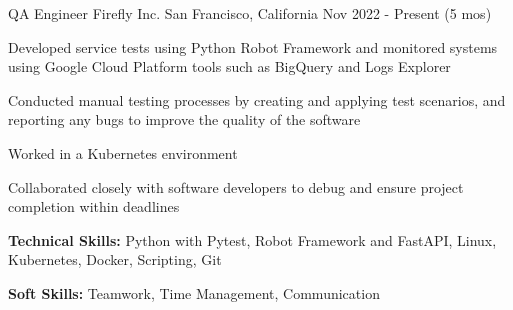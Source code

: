 

\begin{cventries}

  \cventry
    {QA Engineer} %
    {Firefly Inc.} %
    {San Francisco, California} %
    {Nov 2022 - Present (5 mos)} %
    {
      \begin{cvitems} %
        \item {Developed service tests using Python Robot Framework and monitored systems using Google Cloud Platform tools such as BigQuery and Logs Explorer}
        \item {Conducted manual testing processes by creating and applying test scenarios, and reporting any bugs to improve the quality of the software}
        \item {Worked in a Kubernetes environment}
        \item {Collaborated closely with software developers to debug and ensure project completion within deadlines}
        \item {\textbf{Technical Skills:} Python with Pytest, Robot Framework and FastAPI, Linux, Kubernetes, Docker, Scripting, Git}
        \item {\textbf{Soft Skills:} Teamwork, Time Management, Communication}
      \end{cvitems}
    }


\end{cventries}
